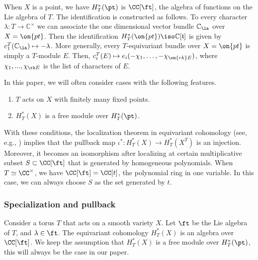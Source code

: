 \documentclass[12pt]{amsart}
\begin{document}
When $X$ is a point, we have $H_{T}^*(\pt)$ is $\CC[\ft]$, the algebra of functions on the Lie algebra of $T$. The identification is constructed as follows. To every character $\lambda\colon T \rightarrow \mathbb{C}^\times$ we can associate the one dimensional vector bundle $\mathbb{C}_\la$ over $X=\on{pt}$. Then the identification $H^*_T(\on{pt}) \iso \mathbb{C}[\mathfrak{t}]$ is given by $c_1^T(\mathbb{C}_\la) \mapsto -\lambda$. More generally, every $T$-equivariant bundle over $X=\on{pt}$ is simply a $T$-module $E$. Then, $c_i^T(E) \mapsto e_i(-\chi_1,\ldots,-\chi_{\on{rk}E})$, where $\chi_1,...,\chi_{\rk E}$ is the list of characters of $E$.





In this paper, we will often consider cases with the following features.
\begin{enumerate}
    \item $T$ acts on $X$ with finitely many fixed points.
    \item $H^*_{T}(X)$ is a free module over $H^*_{T}(\pt)$.
\end{enumerate}
With these conditions, the localization theorem in equivariant cohomology (see, e.g., \cite[Section 5]{Anderson2023EquivariantCI}) implies that the pullback map $\iota^*: H_{T}^*(X)\rightarrow H_{T}^*(X^T)$ is an injection. Moreover, it becomes an isomorphism after localizing at certain multiplicative subset $S\subset \CC[\ft]$ that is generated by homogeneous polynomials. When $T\simeq \CC^\times$, we have $\CC[\ft]= \CC[t]$, the polynomial ring in one variable. In this case, we can always choose $S$ as the set generated by $t$.
\subsubsection{Specialization and pullback} \label{fixed point pullback}
Consider a torus $T$ that acts on a smooth variety $X$. Let $\ft$ be the Lie algebra of $T$, and $\lambda\in \ft$. The equivariant cohomology $H^*_{T}(X)$ is an algebra over $\CC[\ft]$. We keep the assumption that $H^*_{T}(X)$ is a free module over $H^*_{T}(\pt)$, this will always be the case in our paper.
\end{document}
